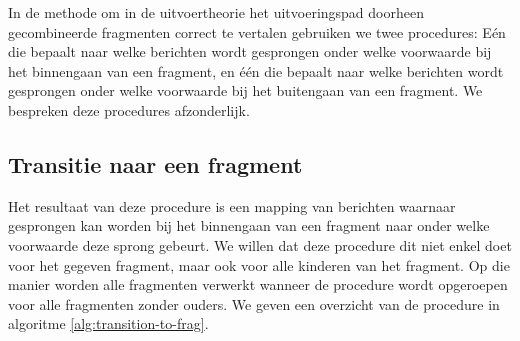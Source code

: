 In de methode om in de uitvoertheorie het uitvoeringspad doorheen gecombineerde fragmenten correct te vertalen gebruiken we twee procedures: E\'en die bepaalt naar welke berichten wordt gesprongen onder welke voorwaarde bij het binnengaan van een fragment, en \'e\'en die bepaalt naar welke berichten wordt gesprongen onder welke voorwaarde bij het buitengaan van een fragment. We bespreken deze procedures afzonderlijk.

\subsection{Transitie naar een fragment}\label{sec:transition-to}

Het resultaat van deze procedure is een mapping van berichten waarnaar gesprongen kan worden bij het binnengaan van een fragment naar onder welke voorwaarde deze sprong gebeurt. We willen dat deze procedure dit niet enkel doet voor het gegeven fragment, maar ook voor alle kinderen van het fragment. Op die manier worden alle fragmenten verwerkt wanneer de procedure wordt opgeroepen voor alle fragmenten zonder ouders.
We geven een overzicht van de procedure in algoritme \ref{alg:transition-to-frag}.

\parbreak

